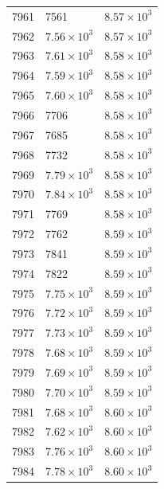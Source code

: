 \begin{table}[H]
\begin{tabular}{lll}
7961 & 7561 & $\displaystyle 8.57 \times 10^{3}$ \\
7962 & $\displaystyle 7.56 \times 10^{3}$ & $\displaystyle 8.57 \times 10^{3}$ \\
7963 & $\displaystyle 7.61 \times 10^{3}$ & $\displaystyle 8.58 \times 10^{3}$ \\
7964 & $\displaystyle 7.59 \times 10^{3}$ & $\displaystyle 8.58 \times 10^{3}$ \\
7965 & $\displaystyle 7.60 \times 10^{3}$ & $\displaystyle 8.58 \times 10^{3}$ \\
7966 & 7706 & $\displaystyle 8.58 \times 10^{3}$ \\
7967 & 7685 & $\displaystyle 8.58 \times 10^{3}$ \\
7968 & 7732 & $\displaystyle 8.58 \times 10^{3}$ \\
7969 & $\displaystyle 7.79 \times 10^{3}$ & $\displaystyle 8.58 \times 10^{3}$ \\
7970 & $\displaystyle 7.84 \times 10^{3}$ & $\displaystyle 8.58 \times 10^{3}$ \\
7971 & 7769 & $\displaystyle 8.58 \times 10^{3}$ \\
7972 & 7762 & $\displaystyle 8.59 \times 10^{3}$ \\
7973 & 7841 & $\displaystyle 8.59 \times 10^{3}$ \\
7974 & 7822 & $\displaystyle 8.59 \times 10^{3}$ \\
7975 & $\displaystyle 7.75 \times 10^{3}$ & $\displaystyle 8.59 \times 10^{3}$ \\
7976 & $\displaystyle 7.72 \times 10^{3}$ & $\displaystyle 8.59 \times 10^{3}$ \\
7977 & $\displaystyle 7.73 \times 10^{3}$ & $\displaystyle 8.59 \times 10^{3}$ \\
7978 & $\displaystyle 7.68 \times 10^{3}$ & $\displaystyle 8.59 \times 10^{3}$ \\
7979 & $\displaystyle 7.69 \times 10^{3}$ & $\displaystyle 8.59 \times 10^{3}$ \\
7980 & $\displaystyle 7.70 \times 10^{3}$ & $\displaystyle 8.59 \times 10^{3}$ \\
7981 & $\displaystyle 7.68 \times 10^{3}$ & $\displaystyle 8.60 \times 10^{3}$ \\
7982 & $\displaystyle 7.62 \times 10^{3}$ & $\displaystyle 8.60 \times 10^{3}$ \\
7983 & $\displaystyle 7.76 \times 10^{3}$ & $\displaystyle 8.60 \times 10^{3}$ \\
7984 & $\displaystyle 7.78 \times 10^{3}$ & $\displaystyle 8.60 \times 10^{3}$ \\

\end{tabular}
\end{table}
